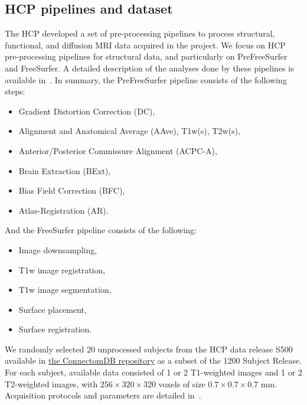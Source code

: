\documentclass[a4paper,num-refs]{oup-contemporary}
\begin{document}
\subsection{HCP pipelines and dataset}


The HCP developed a set of pre-processing pipelines to process structural,
functional, and diffusion MRI data acquired in the project. We focus on HCP
pre-processing pipelines for structural data, and particularly
on PreFreeSurfer and FreeSurfer. 
A detailed description of the analyses done by these
pipelines is available in~\cite{glasser2013}. 
In summary, the PreFreeSurfer pipeline consists of the following steps: 
\begin{itemize}
\item Gradient Distortion Correction (DC), 
\item Alignment and Anatomical Average (AAve), T1w(s), T2w(s),  
\item Anterior/Posterior Commissure Alignment (ACPC-A), 
\item Brain Extraction (BExt), 
\item Bias Field Correction (BFC), 
\item Atlas-Registration (AR).
\end{itemize}
And the FreeSurfer pipeline consists of the following:
\begin{itemize}
\item Image downsampling, 
\item T1w image registration, 
\item T1w image segmentation,
\item Surface placement, 
\item Surface registration.
\end{itemize}

We randomly selected 20 unprocessed subjects from the HCP data release S500
available in \href{https://db.humanconnectome.org}{the ConnectomDB
repository} as a subset of the 1200 Subject Release. For each subject,
available data consisted of 1 or 2 T1-weighted images and 1 or 2
T2-weighted images, with $256 \times 320 \times 320$ voxels of size $0.7
\times 0.7 \times 0.7$ mm. Acquisition protocols and parameters are
detailed in~\cite{van2013wu}. 
\end{document}
